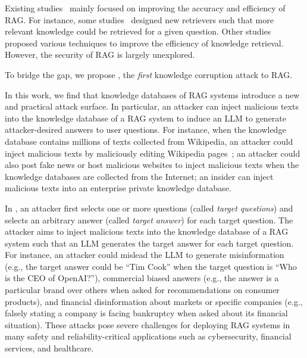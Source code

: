Existing studies~\cite{asai2023self, izacard2022unsupervised, xiong2021approximate, peng2023soft, kassner2020bert, karpukhin-etal-2020-dense} mainly focused on improving the accuracy and efficiency of RAG. For instance, some studies~\cite{izacard2022unsupervised, xiong2021approximate, karpukhin-etal-2020-dense} designed new retrievers such that more relevant knowledge could be retrieved for a given question. Other studies~\cite{asai2023self, peng2023soft, kassner2020bert} proposed various techniques to improve the efficiency of knowledge retrieval.
However, the security of RAG is largely unexplored.


To bridge the gap, we propose {\name}, the \emph{first} knowledge corruption attack to RAG. 


\noindent
{} In this work, we find that knowledge databases of RAG systems introduce a new and practical attack surface. In particular, an attacker can inject malicious texts into the knowledge database of a RAG system to induce an LLM to generate attacker-desired answers to user questions. For instance, when the knowledge database contains millions of texts collected from Wikipedia, an attacker could inject malicious texts by maliciously editing Wikipedia pages~\cite{carlini2023poisoning}; an attacker could also post fake news or host malicious websites to inject malicious texts when the knowledge databases are collected from the Internet; an insider can inject malicious texts into an enterprise private knowledge database.



 In {\name}, an attacker first selects one or more questions (called \emph{target questions}) and selects an arbitrary answer (called \emph{target answer}) for each target question. The attacker aims to inject malicious texts into the knowledge database of a RAG system such that an LLM generates the target answer for each target question. For instance, an attacker could mislead the LLM to generate misinformation (e.g., the target answer could be ``Tim Cook'' when the target question is ``Who is the CEO of OpenAI?''), commercial biased answers (e.g., the answer is a particular brand over others when asked for recommendations on consumer products), and financial disinformation about markets or specific companies (e.g., falsely stating a company is facing bankruptcy when asked about its financial situation).
 These attacks pose severe challenges for deploying RAG systems in many safety and reliability-critical applications such as cybersecurity, financial services, and healthcare. 

